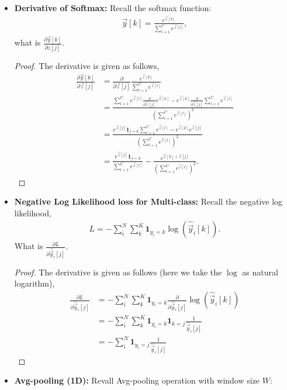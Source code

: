 \documentclass[11pt]{article}
\newcommand{\1}{\mathbf{1}}
\begin{document}
{\begin{itemize}
\item {\bf Derivative of Softmax:} Recall the softmax function:
\begin{align*}
  \vec{y}[k] = \frac{e^{\vec{z}[k]}}{\sum_{l=1}^C e^{\vec{z}[l]}},
\end{align*}
what is $\frac{\partial \vec{y}[k]}{\partial z[j]}$.
\begin{proof}
  The derivative is given as follows,
  \begin{align*}
    \frac{\partial \vec{y}[k]}{\partial \vec{z}[j]} &= \frac{\partial}{\partial \vec{z}[j]} \frac{e^{{\vec{z}}[k]}}{\sum_{l=1}^C e^{{\vec{z}}[l]}} \\
    &=\frac{\sum_{l=1}^C e^{{\vec{z}}[l]} \frac{\partial}{\partial \vec{z}[j]} e^{\vec{z}[k]} - e^{\vec{z}[k]} \frac{\partial}{\partial \vec{z}[j]} \sum_{l=1}^C e^{{\vec{z}}[l]} }{\left(\sum_{l=1}^C e^{{\vec{z}}[l]}\right)^2} \\
    &= \frac{e^{\vec{z}[j]} \1_{j=k} \sum_{l=1}^C e^{{\vec{z}}[l]}  - e^{\vec{z}[k]} e^{\vec{z}[j]} }{\left(\sum_{l=1}^C e^{{\vec{z}}[l]}\right)^2} \\
    &= \frac{e^{\vec{z}[j]}\1_{j=k}}{\sum_{l=1}^C e^{{\vec{z}}[l]}} - \frac{e^{\vec{z}[k] + \vec{z}[j]}}{\left(\sum_{l=1}^C e^{{\vec{z}}[l]}\right)^2}.
  \end{align*}
\end{proof}
\item {\bf Negative Log Likelihood loss for Multi-class:} Recall the negative log likelihood,
\begin{align*}
  L = -\sum_{i}^N \sum_k^K \1_{y_i =k} \log (\hat{\vec{y}}_i[k]).
\end{align*}
What is $\frac{\partial L}{\partial \hat{\vec{y}}_i[j]}$.
\begin{proof}
  The derivative is given as follows (here we take the $\log$ as natural logarithm),
  \begin{align*}
    \frac{\partial L}{\partial \hat{\vec{y}}_i[j]} &= -\sum_{i}^N \sum_k^K \1_{y_i =k} \frac{\partial}{\partial \hat{\vec{y}}_i[j]} \log (\hat{\vec{y}}_i[k]) \\
    &= -\sum_{i}^N \sum_k^K \1_{y_i =k} \1_{k = j} \frac{1}{\hat{\vec{y}}_i[j]} \\
    &= -\sum_{i}^N \1_{y_i =j} \frac{1}{\hat{\vec{y}}_i[j]}
  \end{align*}
\end{proof}
\item {\bf Avg-pooling (1D):} Revall Avg-pooling operation with window size $W$:

\end{itemize}}
\end{document}

